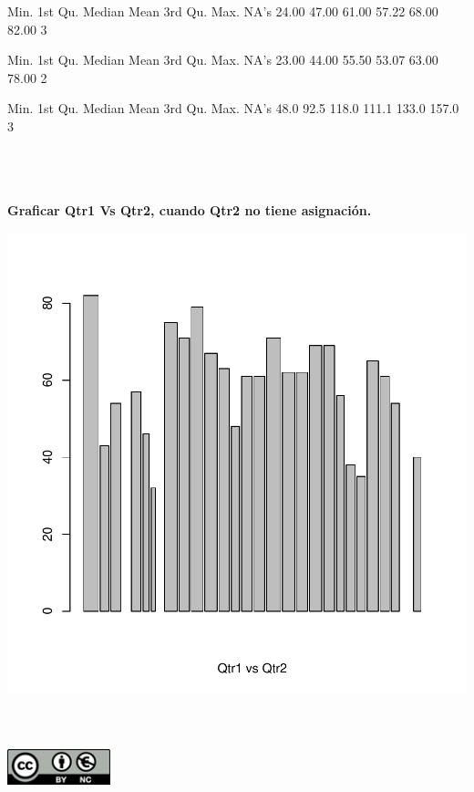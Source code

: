 \documentclass[11pt]{report}
\begin{document}
\begin{Schunk}
\begin{Soutput}
   Min. 1st Qu.  Median    Mean 3rd Qu.    Max.    NA's 
  24.00   47.00   61.00   57.22   68.00   82.00       3 
\end{Soutput}
\begin{Soutput}
   Min. 1st Qu.  Median    Mean 3rd Qu.    Max.    NA's 
  23.00   44.00   55.50   53.07   63.00   78.00       2 
\end{Soutput}
\begin{Soutput}
   Min. 1st Qu.  Median    Mean 3rd Qu.    Max.    NA's 
   48.0    92.5   118.0   111.1   133.0   157.0       3 
\end{Soutput}
\end{Schunk}
\\\\\\
\textbf{Graficar Qtr1 Vs Qtr2, cuando Qtr2 no tiene asignación.}

\includegraphics{L1_T1_1900481878-004}
\\\\\\

\includegraphics[width=3cm, height=2cm]{licencia.png}
\end{document}
